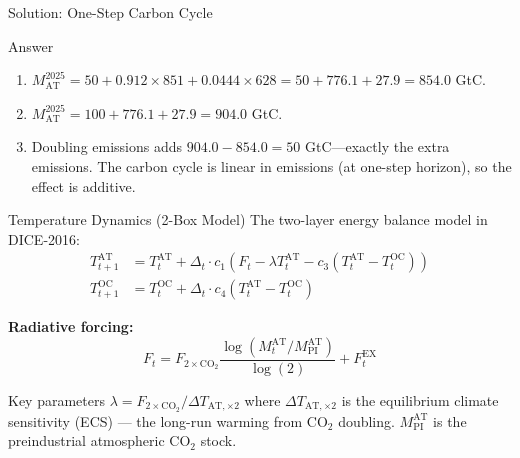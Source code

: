 \documentclass[aspectratio=169,11pt]{beamer}
\newcommand{\emphc}[1]{\textcolor{harvardcrimson}{#1}}
\begin{document}
\begin{frame}{Solution: One-Step Carbon Cycle}
\begin{block}{Answer}
\begin{enumerate}
    \item $M_{\text{AT}}^{2025} = 50 + 0.912 \times 851 + 0.0444 \times 628 = 50 + 776.1 + 27.9 = 854.0$ GtC.
    \item $M_{\text{AT}}^{2025} = 100 + 776.1 + 27.9 = 904.0$ GtC.
    \item Doubling emissions adds $904.0 - 854.0 = 50$ GtC---exactly the extra emissions.  The carbon cycle is \emphc{linear} in emissions (at one-step horizon), so the effect is additive.
\end{enumerate}
\end{block}
\end{frame}

\begin{frame}{Temperature Dynamics (2-Box Model)}
\small
The two-layer energy balance model in DICE-2016:
\begin{align*}
    T^{\mathrm{AT}}_{t+1} &= T^{\mathrm{AT}}_{t} + \Delta_t \cdot c_{1} \left(F_{t} - \lambda T^{\mathrm{AT}}_{t} - c_{3}\left(T^{\mathrm{AT}}_{t} - T^{\mathrm{OC}}_{t}\right)\right) \\
    T^{\mathrm{OC}}_{t+1} &= T^{\mathrm{OC}}_{t} + \Delta_t \cdot c_{4} \left(T^{\mathrm{AT}}_{t} - T^{\mathrm{OC}}_{t}\right)
\end{align*}

\textbf{Radiative forcing:}
\[
    F_{t} = F_{\mathrm{2\times CO_2}} \frac{\log(M^{\mathrm{AT}}_{t}/M^{\mathrm{AT}}_{\mathrm{PI}})}{\log(2)} + F^{\mathrm{EX}}_{t}
\]

\begin{alertblock}{Key parameters}
$\lambda = F_{\mathrm{2\times CO_2}}/\Delta T_{\mathrm{AT},\times 2}$ where $\Delta T_{\mathrm{AT},\times 2}$ is the \emphc{equilibrium climate sensitivity} (ECS) --- the long-run warming from CO$_2$ doubling. $M^{\mathrm{AT}}_{\mathrm{PI}}$ is the preindustrial atmospheric CO$_2$ stock.
\end{alertblock}
\end{frame}
\end{document}
